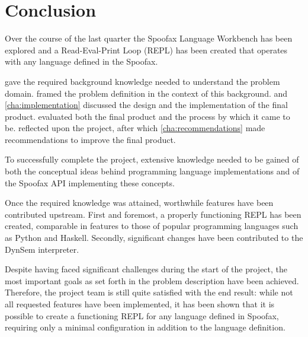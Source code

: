 \chapter{Conclusion}
\label{cha:conclusion}

Over the course of the last quarter the Spoofax Language Workbench has been
explored and a Read-Eval-Print Loop (REPL) has been created that operates with
any language defined in the Spoofax.

 gave the required background knowledge needed to
understand the problem domain.  framed the problem
definition in the context of this background.  and
\cref{cha:implementation} discussed the design and the implementation of the
final product.  evaluated both the final product and the
process by which it came to be.  reflected upon the
project, after which \cref{cha:recommendations} made recommendations to improve
the final product.

To successfully complete the project, extensive knowledge needed to be gained of
both the conceptual ideas behind programming language implementations and of the
Spoofax API implementing these concepts.

Once the required knowledge was attained, worthwhile features have been
contributed upstream. First and foremost, a properly functioning REPL has been
created, comparable in features to those of popular programming languages such
as Python and Haskell. Secondly, significant changes have been contributed to
the DynSem interpreter.

Despite having faced significant challenges during the start of the project, the
most important goals as set forth in the problem description have been achieved.
Therefore, the project team is still quite satisfied with the end result: while
not all requested features have been implemented, it has been shown that it is
possible to create a functioning REPL for any language defined in Spoofax,
requiring only a minimal configuration in addition to the language definition.


